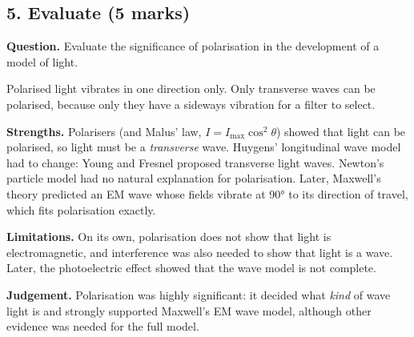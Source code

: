 \subsection*{5. Evaluate (5 marks)}
\textbf{Question.} Evaluate the significance of polarisation in the development of a model of
light.

\begin{modelanswer}
Polarised light vibrates in one direction only. Only transverse waves can be polarised,
because only they have a sideways vibration for a filter to select.

\textbf{Strengths.} Polarisers (and Malus' law, $I = I_\mathrm{max}\cos^2\theta$) showed
that light can be polarised, so light must be a \emph{transverse} wave. Huygens' longitudinal
wave model had to change: Young and Fresnel proposed transverse light waves. Newton's particle
model had no natural explanation for polarisation. Later, Maxwell's theory predicted an EM
wave whose fields vibrate at \ang{90} to its direction of travel, which fits polarisation
exactly.

\textbf{Limitations.} On its own, polarisation does not show that light is electromagnetic,
and interference was also needed to show that light is a wave. Later, the photoelectric
effect showed that the wave model is not complete.

\textbf{Judgement.} Polarisation was highly significant: it decided what \emph{kind} of wave
light is and strongly supported Maxwell's EM wave model, although other evidence was needed
for the full model.
\end{modelanswer}
\begin{markingcriteria}
\end{markingcriteria}
